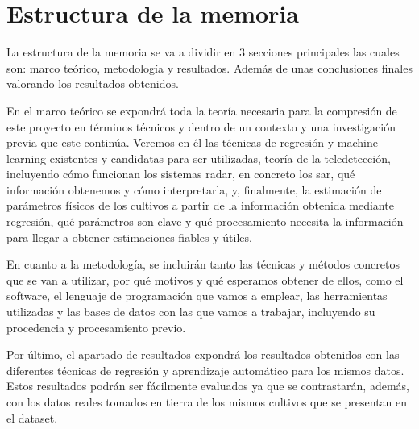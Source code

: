 \section{Estructura de la memoria}
\par La estructura de la memoria se va a dividir en 3 secciones principales las cuales son: marco teórico, metodología y resultados. Además de unas conclusiones finales valorando los resultados obtenidos.
\\
\par En el marco teórico se expondrá toda la teoría necesaria para la compresión de este proyecto en términos técnicos y dentro de un contexto y una investigación previa que este continúa. Veremos en él las técnicas de regresión y machine learning existentes y candidatas para ser utilizadas, teoría de la teledetección, incluyendo cómo funcionan los sistemas radar, en concreto los \gls{sar}, qué información obtenemos y cómo interpretarla, y, finalmente, la estimación de parámetros físicos de los cultivos a partir de la información obtenida mediante regresión, qué parámetros son clave y qué procesamiento necesita la información para llegar a obtener estimaciones fiables y útiles. 
\\
\par En cuanto a la metodología, se incluirán tanto las técnicas y métodos concretos que se van a utilizar, por qué motivos y qué esperamos obtener de ellos, como el software, el lenguaje de programación que vamos a emplear, las herramientas utilizadas y las bases de datos con las que vamos a trabajar, incluyendo su procedencia y procesamiento previo. 
\\
\par Por último, el apartado de resultados expondrá los resultados obtenidos con las diferentes técnicas de regresión y aprendizaje automático para los mismos datos. Estos resultados podrán ser fácilmente evaluados ya que se contrastarán, además, con los datos reales tomados en tierra de los mismos cultivos que se presentan en el dataset. 
